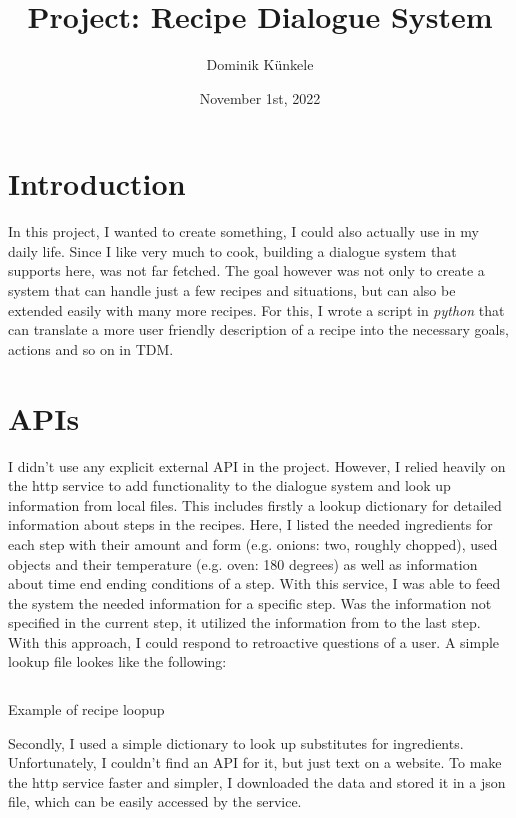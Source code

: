\documentclass[
	11pt, %
]{fphw}
\title{Project: Recipe Dialogue System} %
\date{November 1st, 2022} %
\author{Dominik Künkele}
\institute{University of Gothenburg} %
\newenvironment{code}
    {\captionsetup{
        type=listing,
        skip=2pt,
        belowskip=15pt
        }}
    {}
\begin{document}
\maketitle %

\section*{Introduction}
In this project, I wanted to create something, I could also actually use in my daily life. Since I like very much to cook, building a dialogue system that supports here, was not far fetched. The goal however was not only to create a system that can handle just a few recipes and situations, but can also be extended easily with many more recipes. For this, I wrote a script in \emph{python} that can translate a more user friendly description of a recipe into the necessary goals, actions and so on in TDM.

\section*{APIs}\label{section:api}
I didn't use any explicit external API in the project. However, I relied heavily on the http service to add functionality to the dialogue system and look up information from local files. This includes firstly a lookup dictionary for detailed information about steps in the recipes. Here, I listed the needed ingredients for each step with their amount and form (e.g. onions: two, roughly chopped), used objects and their temperature (e.g. oven: 180 degrees) as well as information about time end ending conditions of a step. With this service, I was able to feed the system the needed information for a specific step. Was the information not specified in the current step, it utilized the information from to the last step. With this approach, I could respond to retroactive questions of a user. A simple lookup file lookes like the following:

\begin{code}
    \inputminted{json}{includes/recipe_lookup.json}
    \caption{Example of recipe loopup}
\end{code}

Secondly, I used a simple dictionary to look up substitutes for ingredients. Unfortunately, I couldn't find an API for it, but just text on a website. To make the http service faster and simpler, I downloaded the data and stored it in a json file, which can be easily accessed by the service.
\end{document}
